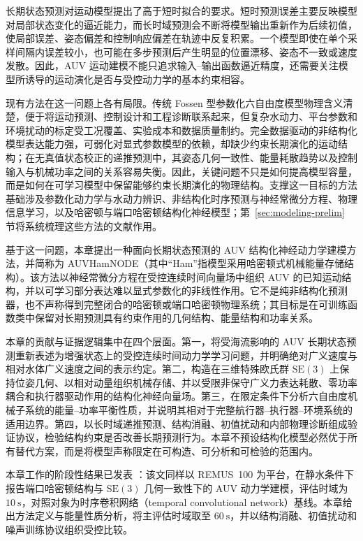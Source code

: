 \documentclass[UTF8,zihao=-4]{ctexrep}
\newcommand{\SE}{\mathrm{SE}}
\begin{document}
长期状态预测对运动模型提出了高于短时拟合的要求。短时预测误差主要反映模型对局部状态变化的逼近能力，而长时域预测会不断将模型输出重新作为后续初值，使局部误差、姿态偏差和控制响应偏差在轨迹中反复积累。一个模型即使在单个采样间隔内误差较小，也可能在多步预测后产生明显的位置漂移、姿态不一致或速度发散。因此，AUV 运动建模不能只追求输入--输出函数逼近精度，还需要关注模型所诱导的运动演化是否与受控动力学的基本约束相容。

现有方法在这一问题上各有局限。传统 Fossen 型参数化六自由度模型物理含义清楚，便于将运动预测、控制设计和工程诊断联系起来，但复杂水动力、平台参数和环境扰动的标定受工况覆盖、实验成本和数据质量制约。完全数据驱动的非结构化模型表达能力强，可弱化对显式参数模型的依赖，却缺少约束长期演化的运动结构；在无真值状态校正的递推预测中，其姿态几何一致性、能量耗散趋势以及控制输入与机械功率之间的关系容易失衡。因此，关键问题不只是如何提高模型容量，而是如何在可学习模型中保留能够约束长期演化的物理结构。支撑这一目标的方法基础涉及参数化动力学与水动力辨识、非结构化时序预测与神经常微分方程、物理信息学习，以及哈密顿与端口哈密顿结构化神经模型；第~\ref{sec:modeling-prelim} 节将系统梳理这些方法的文献作用。

基于这一问题，本章提出一种面向长期状态预测的 AUV 结构化神经动力学建模方法，并简称为 AUVHamNODE（其中“Ham”指模型采用哈密顿式机械能量存储结构）。该方法以神经常微分方程在受控连续时间向量场中组织 AUV 的已知运动结构，并以可学习部分表达难以显式参数化的非线性作用。它不是纯非结构化预测器，也不声称得到完整闭合的哈密顿或端口哈密顿物理系统；其目标是在可训练函数类中保留对长期预测具有约束作用的几何结构、能量结构和功率关系。

本章的贡献与证据逻辑集中在四个层面。第一，将受海流影响的 AUV 长期状态预测重新表述为增强状态上的受控连续时间动力学学习问题，并明确绝对广义速度与相对水体广义速度之间的表示约定。第二，构造在三维特殊欧氏群 \(\SE(3)\) 上保持位姿几何、以相对动量组织机械存储、并以受限非保守广义力表达耗散、零功率耦合和执行器驱动作用的结构化神经向量场。第三，在限定条件下分析六自由度机械子系统的能量--功率平衡性质，并说明其相对于完整航行器--执行器--环境系统的适用边界。第四，以长时域递推预测、结构消融、初值扰动和内部物理诊断组成验证协议，检验结构约束是否改善长期预测行为。本章不预设结构化模型必然优于所有替代方案，而是将模型声称限定在可构造、可分析和可检验的范围内。

本章工作的阶段性结果已发表 \citep{jin2025phnodeauv}：该文同样以 REMUS~100 为平台，在静水条件下报告端口哈密顿结构与 \(\SE(3)\) 几何一致性下的 AUV 动力学建模，评估时域为 \(10~\mathrm{s}\)，对照对象为时序卷积网络（temporal convolutional network）基线。本章给出方法定义与能量性质分析，将主评估时域取至 \(60~\mathrm{s}\)，并以结构消融、初值扰动和噪声训练协议组织受控比较。
\end{document}
